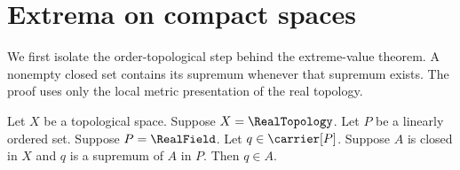 \section{Extrema on compact spaces}






We first isolate the order-topological step behind the extreme-value theorem.
A nonempty closed set contains its supremum whenever that supremum exists.
The proof uses only the local metric presentation of the real topology.

\begin{theorem}\label{closed_real_set_contains_supremum}
    Let $X$ be a topological space.
    Suppose $X=\RealTopology$.
    Let $P$ be a linearly ordered set.
    Suppose $P=\RealField$.
    Let $q\in\carrier[P]$.
    Suppose $A$ is closed in $X$ and $q$ is a supremum of $A$ in $P$.
    Then $q\in A$.
\end{theorem}
